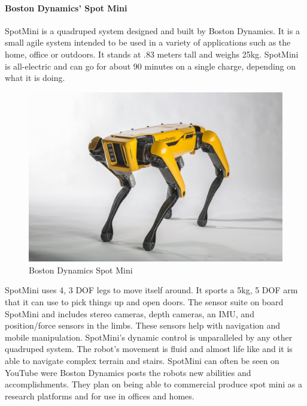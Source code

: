 \paragraph{Boston Dynamics’ Spot Mini}
SpotMini is a quadruped system designed and built by Boston Dynamics. It is a small agile system intended to be used in a variety of applications such as the home, office or outdoors. It stands at .83 meters tall and weighs 25kg. SpotMini is all-electric and can go for about 90 minutes on a single charge, depending on what it is doing.     
     \begin{figure}[H]
        \centering
        \includegraphics[width=120mm]{figures/SpotMini.jpg}
        \caption{Boston Dynamics Spot Mini}
        \label{fig:my_label}
    \end{figure}
SpotMini uses 4, 3 DOF legs to move itself around. It sports a 5kg, 5 DOF arm that it can use to pick things up and open doors. The sensor suite on board SpotMini and includes stereo cameras, depth cameras, an IMU, and position/force sensors in the limbs. These sensors help with navigation and mobile manipulation. SpotMini's dynamic control is unparalleled by any other quadruped system. The robot's movement is fluid and almost life like and it is able to navigate complex terrain and stairs. SpotMini can often be seen on YouTube were Boston Dynamics posts the robots new abilities and accomplishments. They plan on being able to commercial produce spot mini as a research platforms and for use in offices and homes.
